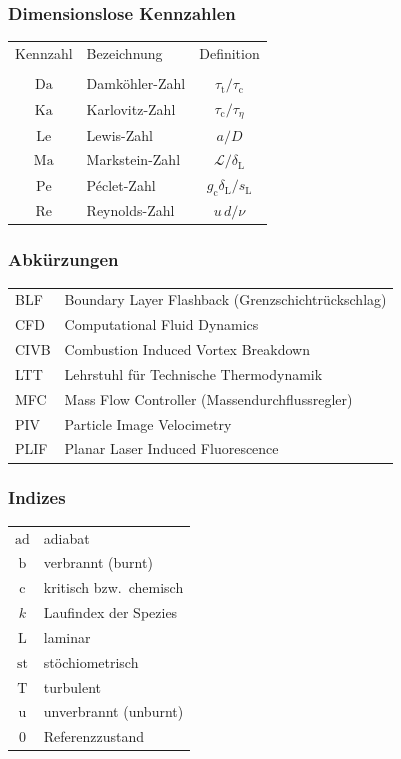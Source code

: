 \subsubsection{Dimensionslose Kennzahlen}

\begin{tabularx}{\textwidth}{cXc}
Kennzahl & Bezeichnung & Definition \\ \\
  $\mathrm{Da}$ & Damköhler-Zahl  & $\tau_\mathrm{t}/\tau_\mathrm{c}$ \\
  $\mathrm{Ka}$ & Karlovitz-Zahl  & $\tau_\mathrm{c}/\tau_\eta$ \\
  $\mathrm{Le}$ & Lewis-Zahl      & $a/D$ \\
  $\mathrm{Ma}$ & Markstein-Zahl  & $\mathcal{L}/\delta_\mathrm{L}$ \\
  $\mathrm{Pe}$ & Péclet-Zahl     & $g_\mathrm{c}\delta_\mathrm{L}/s_\mathrm{L}$ \\
  $\mathrm{Re}$ & Reynolds-Zahl   & $u\,d/\nu$ \\
\end{tabularx}


\subsubsection{Abkürzungen}

\begin{tabularx}{\textwidth}{lX}
BLF   & Boundary Layer Flashback (Grenzschichtrückschlag) \\
CFD   & Computational Fluid Dynamics \\
CIVB  & Combustion Induced Vortex Breakdown \\
LTT   & Lehrstuhl für Technische Thermodynamik \\
MFC   & Mass Flow Controller (Massendurchflussregler) \\
PIV   & Particle Image Velocimetry \\
PLIF  & Planar Laser Induced Fluorescence \\
\end{tabularx}


\subsubsection{Indizes}

\begin{tabularx}{\textwidth}{cX}
  $\mathrm{ad}$ & adiabat \\
  $\mathrm{b}$  & verbrannt (burnt) \\
  $\mathrm{c}$  & kritisch bzw.\ chemisch \\
  $k$           & Laufindex der Spezies \\
  $\mathrm{L}$  & laminar \\
  $\mathrm{st}$ & stöchiometrisch \\
  $\mathrm{T}$  & turbulent \\
  $\mathrm{u}$  & unverbrannt (unburnt) \\
  $0$           & Referenzzustand \\
\end{tabularx}

